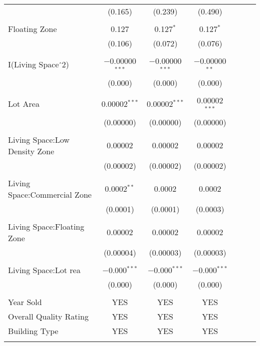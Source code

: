 \documentclass[a4paper]{article}
\begin{document}
\begin{table}[!htbp]
\begin{adjustwidth}{0.5cm}{-0cm}
\begin{threeparttable}
\begin{tabular}{@{\extracolsep{-7pt}}lcccccc}
  & (0.165) & (0.239) & (0.490) \\ 
  & & & \\ 
 Floating Zone & 0.127 & 0.127$^{*}$ & 0.127$^{*}$ \\ 
  & (0.106) & (0.072) & (0.076) \\ 
  & & & \\ 
 I(Living Space$\hat{\mkern6mu}$2) & $-$0.00000$^{***}$ & $-$0.00000$^{***}$ & $-$0.00000$^{**}$ \\ 
  & (0.000) & (0.000) & (0.000) \\ 
  & & & \\ 
 Lot Area & 0.00002$^{***}$ & 0.00002$^{***}$ & 0.00002$^{***}$ \\ 
  & (0.00000) & (0.00000) & (0.00000) \\ 
  & & & \\  
 Living Space:Low Density Zone & 0.00002 & 0.00002 & 0.00002 \\ 
  & (0.00002) & (0.00002) & (0.00002) \\ 
  & & & \\ 
 Living Space:Commercial Zone & 0.0002$^{**}$ & 0.0002 & 0.0002 \\ 
  & (0.0001) & (0.0001) & (0.0003) \\ 
  & & & \\ 
 Living Space:Floating Zone & 0.00002 & 0.00002 & 0.00002 \\ 
  & (0.00004) & (0.00003) & (0.00003) \\ 
  & & & \\ 
 Living Space:Lot rea & $-$0.000$^{***}$ & $-$0.000$^{***}$ & $-$0.000$^{***}$ \\ 
  & (0.000) & (0.000) & (0.000) \\ 
  & & & \\ 
  Year Sold & YES & YES & YES  \\ 
  Overall Quality Rating & YES & YES & YES  \\  
  Building Type & YES & YES & YES \\ 
\hline \\[-1.8ex] 


\end{tabular}
\end{threeparttable}
\end{adjustwidth}
\end{table}
\end{document}
